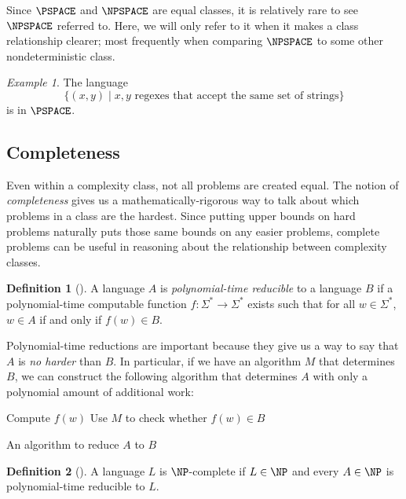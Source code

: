\documentclass[english,12pt]{reedthesis}
\theoremstyle{plain}
\theoremstyle{definition}
\newtheorem{defn}[defn]{Definition}
\theoremstyle{remark}
\newtheorem{example}{Example}[thm]
\begin{document}
Since $\PSPACE$ and $\NPSPACE$ are equal classes, it is relatively rare to see
$\NPSPACE$ referred to. Here, we will only refer to it when it makes a class
relationship clearer; most frequently when comparing $\NPSPACE$ to some other
nondeterministic class.

\begin{example}\label{ex:regex-is-pspace}
  The language
  \[
    \{(x, y) \mid x, y \text{ regexes that accept the same set of strings}\}
  \]
  is in $\PSPACE$. %
\end{example}

\subsection{Completeness}

Even within a complexity class, not all problems are created equal. The notion
of \emph{completeness} gives us a mathematically-rigorous way to talk about
which problems in a class are the hardest. Since putting upper bounds on hard
problems naturally puts those same bounds on any easier problems, complete
problems can be useful in reasoning about the relationship between complexity
classes.

\begin{defn}[{\cite[Def.\ 7.29]{Sip97}}]\label{def:p-reduction}
  A language $A$ is \emph{polynomial-time reducible} to a language $B$ if a
  polynomial-time computable function $f\colon \Sigma^{*} \rightarrow \Sigma^{*}$ exists
  such that for all $w \in \Sigma^{*}$, $w \in A$ if and only if $f(w) \in B$.
\end{defn}

Polynomial-time reductions are important because they give us a way to say that
$A$ is \emph{no harder} than $B$. In particular, if we have an algorithm $M$
that determines $B$, we can construct the following algorithm that determines
$A$ with only a polynomial amount of additional work:

\begin{algorithm}[H]
  Compute $f(w)$\;
  Use $M$ to check whether $f(w) \in B$\;
  \;
  \caption{An algorithm to reduce $A$ to $B$}
\end{algorithm}

\begin{defn}[{\cite[Def.\ 7.34]{Sip97}}]\label{def:np-complete}
  A language $L$ is $\NP$-complete if $L \in \NP$ and every $A \in \NP$ is
  polynomial-time reducible to $L$.
\end{defn}
\end{document}
